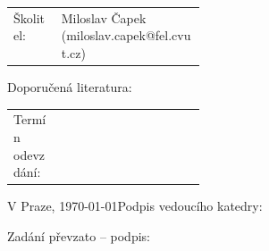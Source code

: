 \documentclass[11pt, a4paper]{article}
\makeatletter
\newcommand{\skolitel}{Miloslav Čapek (miloslav.capek@fel.cvut.cz)}
\newcommand{\termin}{}
\makeatother
\begin{document}
\vspace{2ex}

\begin{tabularx}{\linewidth}{@{} p{0.25\linewidth} X @{}}
    Školitel: & \skolitel
\end{tabularx}

\vspace{2ex}

Doporučená literatura:
\renewcommand{\section}[2]{}
\let\oldbibliography\thebibliography
\renewcommand{\thebibliography}[1]{\small\oldbibliography{#1}\setlength{\itemsep}{0pt}\setlength{\parsep}{0pt}}
\nocite{harrington1968field, catedra1995cgfft, chan1996sine, strang1999discrete, vecchi1999loop, andriulli2013well, adrian2019refinement, harrington1971theory}

\begin{otherlanguage}{english}

\end{otherlanguage}

\vspace{2ex}

\begin{tabularx}{\linewidth}{@{} p{0.25\linewidth} X @{}}
    Termín odevzdání: & \termin
\end{tabularx}

\vspace{2ex}

V Praze, \today \hfill Podpis vedoucího katedry: \hspace{3cm}

\vspace{2ex}

Zadání převzato -- podpis: \dotfill
\end{document}
